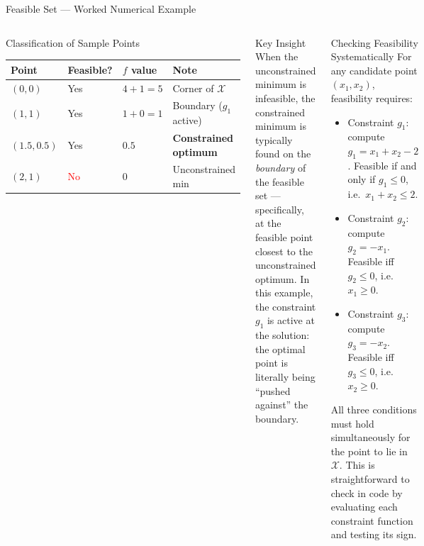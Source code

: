 \documentclass[aspectratio=169,10pt]{beamer}
\begin{document}
\begin{frame}[allowframebreaks]{Feasible Set --- Worked Numerical Example}
  \begin{columns}[T]
      \begin{exampleblock}{Classification of Sample Points}
        \centering
        \begin{tabular}{llll}
          \toprule
          \textbf{Point} & \textbf{Feasible?} & $f$ \textbf{value} & \textbf{Note} \\
          \midrule
          $(0, 0)$   & Yes & $4 + 1 = 5$   & Corner of $\mathcal{X}$ \\
          $(1, 1)$   & Yes & $1 + 0 = 1$   & Boundary ($g_1$ active) \\
          $(1.5, 0.5)$ & Yes & $0.5$ & \textbf{Constrained optimum} \\
          $(2, 1)$   & \textcolor{red}{No}  & $0$           & Unconstrained min \\
          \bottomrule
        \end{tabular}
      \end{exampleblock}
      \begin{alertblock}{Key Insight}
        When the unconstrained minimum is infeasible, the constrained
        minimum is typically found on the \emph{boundary} of the feasible set ---
        specifically, at the feasible point closest to the unconstrained optimum.
        In this example, the constraint $g_1$ is active at the solution: the
        optimal point is literally being ``pushed against'' the boundary.
      \end{alertblock}

      \begin{block}{Checking Feasibility Systematically}
        For any candidate point $(x_1, x_2)$, feasibility requires:
        \begin{itemize}
          \item Constraint $g_1$: compute $g_1 = x_1 + x_2 - 2$.
            Feasible if and only if $g_1 \leq 0$, i.e.\ $x_1 + x_2 \leq 2$.
          \item Constraint $g_2$: compute $g_2 = -x_1$.
            Feasible iff $g_2 \leq 0$, i.e.\ $x_1 \geq 0$.
          \item Constraint $g_3$: compute $g_3 = -x_2$.
            Feasible iff $g_3 \leq 0$, i.e.\ $x_2 \geq 0$.
        \end{itemize}
        All three conditions must hold simultaneously for the point to lie
        in $\mathcal{X}$.  This is straightforward to check in code by
        evaluating each constraint function and testing its sign.
      \end{block}
  \end{columns}

\end{frame}
\end{document}
